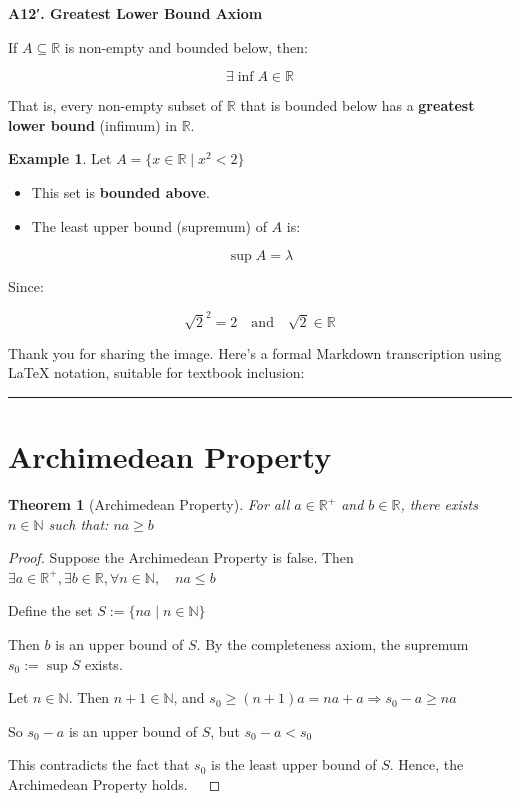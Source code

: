 \documentclass[
]{book}
\providecommand{\tightlist}{%
  \setlength{\itemsep}{0pt}\setlength{\parskip}{0pt}}
\newtheorem{theorem}{Theorem}[chapter]
\theoremstyle{definition}
\theoremstyle{definition}
\newtheorem{example}{Example}[chapter]
\theoremstyle{definition}
\theoremstyle{definition}
\theoremstyle{remark}
\begin{document}
\textbf{A12′. Greatest Lower Bound Axiom}

If \(A \subseteq \mathbb{R}\) is non-empty and bounded below, then:

\[
\exists \inf A \in \mathbb{R}
\]

That is, every non-empty subset of \(\mathbb{R}\) that is bounded below has a \textbf{greatest lower bound} (infimum) in \(\mathbb{R}\).

\begin{example}
\protect\hypertarget{exm:unnamed-chunk-113}{}\label{exm:unnamed-chunk-113}Let \(A = \{ x \in \mathbb{R} \mid x^2 < 2 \}\)

\begin{itemize}
\tightlist
\item
  This set is \textbf{bounded above}.
\item
  The least upper bound (supremum) of \(A\) is:
\end{itemize}

\[
\sup A = \lambda
\]

Since:

\[
\sqrt{2}^2 = 2 \quad \text{and} \quad \sqrt{2} \in \mathbb{R}
\]
\end{example}

Thank you for sharing the image. Here's a formal Markdown transcription using LaTeX notation, suitable for textbook inclusion:

\begin{center}\rule{0.5\linewidth}{0.5pt}\end{center}

\section{Archimedean Property}\label{archimedean-property}

\begin{theorem}[Archimedean Property]
\protect\hypertarget{thm:unnamed-chunk-114}{}\label{thm:unnamed-chunk-114}For all \(a \in \mathbb{R}^+\) and \(b \in \mathbb{R}\), there exists \(n \in \mathbb{N}\) such that: \(na \geq b\)
\end{theorem}

\begin{proof}
Suppose the Archimedean Property is false.
Then\(\exists a \in \mathbb{R}^+, \exists b \in \mathbb{R}, \forall n \in \mathbb{N}, \quad na \leq b\)

Define the set \(S := \{ na \mid n \in \mathbb{N} \}\)

Then \(b\) is an upper bound of \(S\). By the completeness axiom, the supremum \(s_0 := \sup S\) exists.

Let \(n \in \mathbb{N}\). Then \(n + 1 \in \mathbb{N}\), and \(s_0 \geq (n + 1)a = na + a \Rightarrow s_0 - a \geq na\)

So \(s_0 - a\) is an upper bound of \(S\), but \(s_0 - a < s_0\)

This contradicts the fact that \(s_0\) is the least upper bound of \(S\). Hence, the Archimedean Property holds. 
\end{proof}
\end{document}
